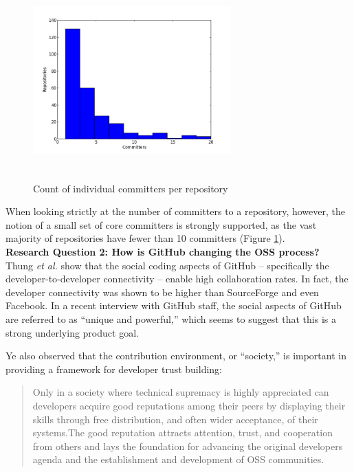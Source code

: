 \documentclass{proc}
\begin{document}
{{{{{\begin{figure}
\includegraphics[height=3in,width=3in]{images/committers_histogram.png}
\caption{Count of individual committers per repository}
\label{fig:committers_histogram}
\end{figure}

When looking strictly at the number of committers to a repository, however, the notion of a small set of core committers is strongly supported, as the vast majority of repositories have fewer than 10 committers (Figure \ref{fig:committers_histogram}).\\

\noindent \textbf{Research Question 2: How is GitHub changing the OSS process?}\\
Thung \textit{et al.} show that the social coding aspects of GitHub -- specifically the developer-to-developer connectivity -- enable high collaboration rates.\cite{thung2013network} In fact, the developer connectivity was shown to be higher than SourceForge and even Facebook. In a recent interview with GitHub staff, the social aspects of GitHub are referred to as ``unique and powerful\cite{begel2013social},'' which seems to suggest that this is a strong underlying product goal.

Ye also observed\cite{ye2003toward} that the contribution environment, or ``society,'' is important in providing a framework for developer trust building:
\begin{quote}
Only in a society where technical supremacy is highly appreciated can developers acquire good reputations among their peers by displaying their skills through free distribution, and often wider acceptance, of their systems.The good reputation attracts attention, trust, and cooperation from others and lays the foundation for advancing the original developers agenda and the establishment and development of OSS communities. 
\end{quote}

}}}}}
\end{document}
